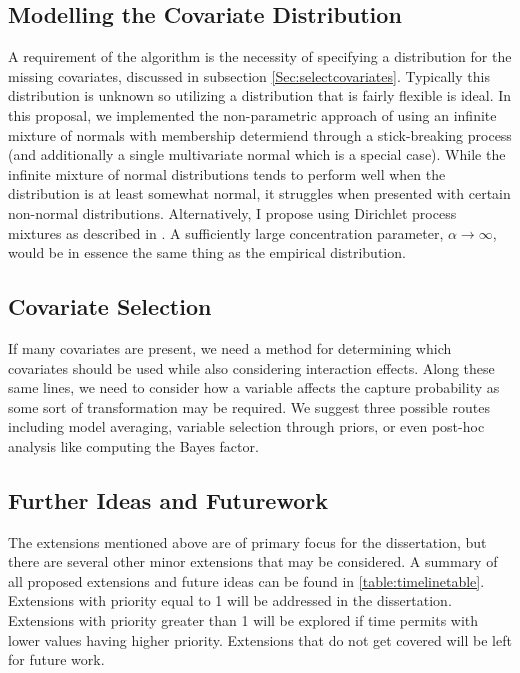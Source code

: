 \documentclass[
  12pt,
]{article}
\begin{document}
\subsection{Modelling the Covariate Distribution}

A requirement of the algorithm is the necessity of specifying a
distribution for the missing covariates, discussed in subsection
\ref{Sec:selectcovariates}. Typically this distribution is unknown so
utilizing a distribution that is fairly flexible is ideal. In this
proposal, we implemented the non-parametric approach of using an
infinite mixture of normals with membership determiend through a
stick-breaking process (and additionally a single multivariate normal
which is a special case). While the infinite mixture of normal
distributions tends to perform well when the distribution is at least
somewhat normal, it struggles when presented with certain non-normal
distributions. Alternatively, I propose using Dirichlet process mixtures
as described in \cite{gelman_bayesian_2014}. A sufficiently large
concentration parameter, \(\alpha \rightarrow \infty\), would be in
essence the same thing as the empirical distribution.

\subsection{Covariate Selection}

If many covariates are present, we need a method for determining which
covariates should be used while also considering interaction effects.
Along these same lines, we need to consider how a variable affects the
capture probability as some sort of transformation may be required. We
suggest three possible routes including model averaging, variable
selection through priors, or even post-hoc analysis like computing the
Bayes factor.

\subsection{Further Ideas and Futurework}

The extensions mentioned above are of primary focus for the
dissertation, but there are several other minor extensions that may be
considered. A summary of all proposed extensions and future ideas can be
found in \autoref{table:timelinetable}. Extensions with priority equal
to 1 will be addressed in the dissertation. Extensions with priority
greater than 1 will be explored if time permits with lower values having
higher priority. Extensions that do not get covered will be left for
future work.
\end{document}
